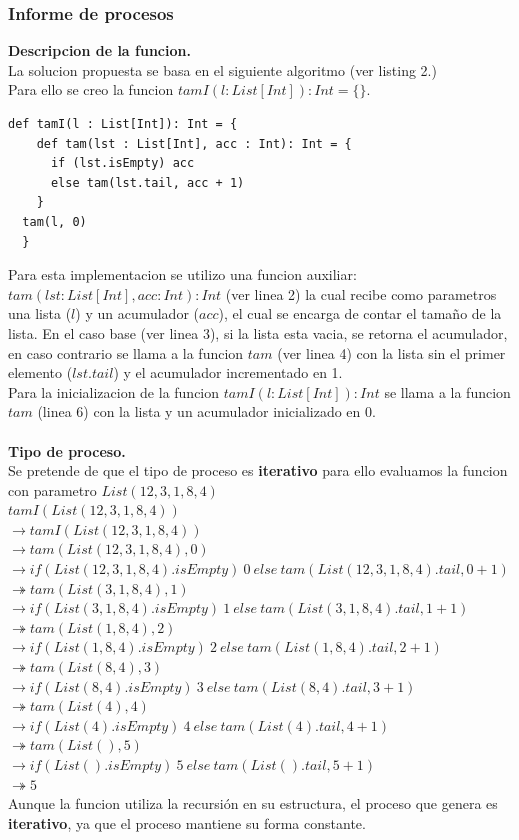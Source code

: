\documentclass[12pt, a4paper]{article}
\begin{document}
\subsubsection{Informe de procesos}
\textbf{Descripcion de la funcion.}\\
La solucion propuesta se basa en el siguiente algoritmo (ver listing 2.) \\
Para ello se creo la funcion $tamI(l:List[Int]):Int = \{\}$.
\begin{lstlisting}[style=scalaStyle, caption=Calcula el tamaño de una lista con un proceso iterativo]
  def tamI(l : List[Int]): Int = {
    def tam(lst : List[Int], acc : Int): Int = {
      if (lst.isEmpty) acc
      else tam(lst.tail, acc + 1)
    }    
  tam(l, 0)
  } 
\end{lstlisting}
Para esta implementacion se utilizo una funcion auxiliar: \\ $tam(lst:List[Int], acc:Int):Int$ (ver linea 2) la cual recibe como parametros una lista ($l$) y un acumulador ($acc$), el cual se encarga de contar el tamaño de la lista.
En el caso base (ver linea 3), si la lista esta vacia, se retorna el acumulador, en caso contrario se llama a la funcion $tam$ (ver linea 4) con la lista sin el primer elemento ($lst.tail$) y el acumulador incrementado en 1. \\
Para la inicializacion de la funcion $tamI(l:List[Int]):Int$ se llama a la funcion $tam$ (linea 6) con la lista y un acumulador inicializado en 0.\\ \\
\textbf{Tipo de proceso.}\\
Se pretende de que el tipo de proceso es \textbf{iterativo} para ello evaluamos la funcion con parametro $List(12, 3, 1, 8, 4)$ \\
$tamI(List(12, 3, 1, 8, 4))$\\
$\rightarrow  tamI(List(12, 3, 1, 8, 4))$ \\
$\rightarrow tam(List(12,3,1,8,4),0)$\\
$\rightarrow if(List(12,3,1,8,4).isEmpty) ~0 ~else ~tam(List(12,3,1,8,4).tail,0+1)$ \\
$\twoheadrightarrow tam(List(3,1,8,4),1)$\\
$\rightarrow if(List(3,1,8,4).isEmpty) ~1 ~else ~tam(List(3,1,8,4).tail,1+1)$ \\
$\twoheadrightarrow tam(List(1,8,4),2)$\\
$\rightarrow if(List(1,8,4).isEmpty) ~2 ~else ~tam(List(1,8,4).tail,2+1)$ \\
$\twoheadrightarrow tam(List(8,4),3)$\\
$\rightarrow if(List(8,4).isEmpty) ~3 ~else ~tam(List(8,4).tail,3+1)$ \\
$\twoheadrightarrow tam(List(4),4)$\\
$\rightarrow if(List(4).isEmpty) ~4 ~else ~tam(List(4).tail,4+1)$ \\
$\twoheadrightarrow tam(List(),5)$\\
$\rightarrow if(List().isEmpty) ~5 ~else ~tam(List().tail,5+1)$ \\
$\twoheadrightarrow 5$\\
Aunque la funcion utiliza la recursión en su estructura, el proceso que genera es \textbf{iterativo}, ya que el proceso mantiene su forma constante.
\end{document}
